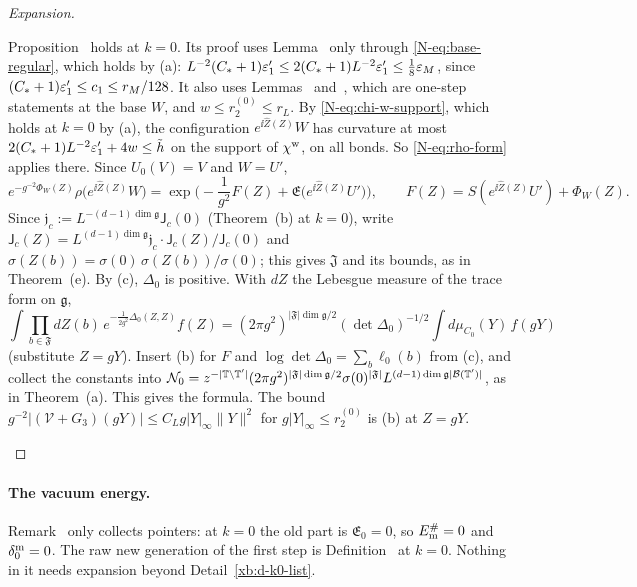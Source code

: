 \begin{proof}[Expansion]
\begin{step}
Proposition~ holds at $k=0$. Its proof uses Lemma~ only through \eqref{N-eq:base-regular}, which holds by (a): $L^{-2}(C_*+1)\varepsilon'_1\le2(C_*+1)L^{-2}\varepsilon'_1\le\frac18\varepsilon_M$, since $(C_*+1)\varepsilon'_1\le c_1\le r_M/128$. It also uses Lemmas~ and~, which are one-step statements at the base $W$, and $w\le r^{(0)}_2\le r_L$. By \eqref{N-eq:chi-w-support}, which holds at $k=0$ by (a), the configuration $e^{\ii\hat Z(Z)}W$ has curvature at most $2(C_*+1)L^{-2}\varepsilon'_1+4w\le\tilde h$ on the support of $\chi^{\rm w}$, on all bonds. So \eqref{N-eq:rho-form} applies there. Since $U_0(V)=V$ and $W=U'$,
\[
e^{-g^{-2}\Phi_W(Z)}\rho\big(e^{\ii\hat Z(Z)}W\big)=\exp\Big(-\frac1{g^2}F(Z)+\mathfrak E\big(e^{\ii\hat Z(Z)}U'\big)\Big),\qquad F(Z)=S(e^{\ii\hat Z(Z)}U')+\Phi_W(Z).
\]
Since $\mathfrak j_c:=L^{-(d-1)\dim\mathfrak g}\mathsf J_c(0)$ (Theorem~(b) at $k=0$), write $\mathsf J_c(Z)=L^{(d-1)\dim\mathfrak g}\mathfrak j_c\cdot\mathsf J_c(Z)/\mathsf J_c(0)$ and $\sigma(Z(b))=\sigma(0)\,\sigma(Z(b))/\sigma(0)$; this gives $\mathfrak J$ and its bounds, as in Theorem~(e). By (c), $\Delta_0$ is positive. With $dZ$ the Lebesgue measure of the trace form on $\mathfrak g$,
\[
\int\prod_{b\in\mathfrak F}dZ(b)\,e^{-\frac1{2g^2}\Delta_0(Z,Z)}f(Z)=(2\pi g^2)^{|\mathfrak F|\dim\mathfrak g/2}(\det\Delta_0)^{-1/2}\int d\mu_{C_0}(Y)\,f(gY)
\]
(substitute $Z=gY$). Insert (b) for $F$ and $\log\det\Delta_0=\sum_b\ell_0(b)$ from (c), and collect the constants into $\mathcal N_0=z^{-|\mathbb T\setminus\mathbb T'|}(2\pi g^2)^{|\mathfrak F|\dim\mathfrak g/2}\sigma(0)^{|\mathfrak F|}L^{(d-1)\dim\mathfrak g|\mathcal B(\mathbb T')|}$, as in Theorem~(a). This gives the formula. The bound $g^{-2}|(\mathcal V+G_3)(gY)|\le C_Lg|Y|_\infty\|Y\|^2$ for $g|Y|_\infty\le r^{(0)}_2$ is (b) at $Z=gY$.
\end{step}
\end{proof}

\paragraph{The vacuum energy.} Remark~ only collects pointers: at $k=0$ the old part is $\mathfrak E_0=0$, so $E^\#_{\rm m}=0$ and $\delta^{\rm m}_0=0$. The raw new generation of the first step is Definition~ at $k=0$. Nothing in it needs expansion beyond Detail~\ref{xb:d-k0-list}.

